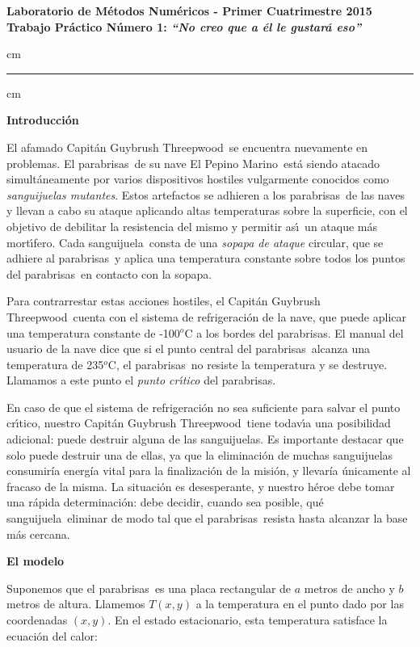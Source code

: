 \documentclass[11pt, a4paper]{article}
\newcommand{\atacante}{sanguijuela}
\newcommand{\capitan}{Capit\'an Guybrush Threepwood}
\newcommand{\objeto}{parabrisas}
\newcommand{\nave}{El Pepino Marino}
\newcommand{\titulotp}{``No creo que a \'el le gustar\'a eso''}
\begin{document}
\begin{centering}
\large\bf Laboratorio de M\'etodos Num\'ericos - Primer Cuatrimestre 2015 \\
\large\bf Trabajo Pr\'actico N\'umero 1: \emph{\titulotp}\\
\end{centering}

 cm
\hrule
{} cm

{\noindent \bf Introducci\'on}

El afamado \capitan\ se encuentra nuevamente en problemas. El
\objeto\ de su nave \nave\ est\'a siendo atacado simult\'aneamente por varios
dispositivos hostiles vulgarmente conocidos como \emph{\atacante s
mutantes}. Estos artefactos se adhieren a los \objeto\ de las naves y
llevan a cabo su ataque aplicando altas temperaturas sobre la superficie, con
el objetivo de debilitar la resistencia del mismo y permitir as\'\i \
un ataque m\'as mort\'\i fero. Cada \atacante\ consta de una \emph{sopapa
de ataque} circular, que se adhiere al \objeto\ y aplica una temperatura
constante sobre todos los puntos del \objeto\ en contacto con la sopapa.

Para con\-tra\-rres\-tar estas acciones hostiles, el \capitan\ cuenta con el sistema de refrigeraci\'on de la nave, que puede aplicar una temperatura constante de -100${}^o$C a los bordes del \objeto.
El manual del usuario de la nave dice que si el punto central del \objeto\ 
alcanza una temperatura de 235${}^o$C, el \objeto\ no resiste la temperatura
y se destruye. Llamamos a este punto el \emph{punto cr\'\i tico} del
\objeto.

En caso de que el sistema de refrigeraci\'on no sea suficiente para salvar
el punto cr\'\i tico, nues\-tro \capitan\ tiene todav\'\i a una posibilidad
adicional: puede des\-tru\-ir alguna de las \atacante s. Es importante destacar que solo puede destruir una de ellas, ya que la eliminaci\'on de muchas \atacante s consumir\'ia  energ\'ia vital para la finalizaci\'on  de la misi\'on, y llevar\'ia \'unicamente al fracaso de la misma.
La situaci\'on es desesperante, y nuestro h\'eroe debe tomar una r\'apida
determinaci\'on: debe decidir, cuando sea posible, qu\'e \atacante\ eliminar de modo tal que el \objeto\ resista hasta alcanzar la base m\'as cercana.

{\noindent \bf El modelo}

Suponemos que el \objeto\ es una placa rectangular de $a$ metros de ancho y $b$ metros de altura. Llamemos $T(x,y)$ a la temperatura en el punto dado por las coordenadas $(x,y)$. En el estado estacionario, esta temperatura satisface la ecuaci\'on del calor:
\end{document}
